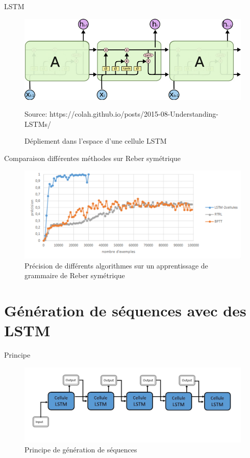 \documentclass{beamer}
\begin{document}
\begin{frame}{LSTM}
  \begin{figure}
  \begin{center}
  \includegraphics[scale=.40]{images/lstm_bptt.png}
  \caption{Dépliement dans l'espace d'une cellule LSTM}
  {\tiny Source: https://colah.github.io/posts/2015-08-Understanding-LSTMs/}
  \end{center}
  \end{figure}
\end{frame}

\begin{frame}{Comparaison différentes méthodes sur Reber symétrique}
  \begin{figure}
  \begin{center}
  \includegraphics[scale=.20]{images/comparaison.png}
  \caption{Précision de différents algorithmes sur un apprentissage de grammaire de Reber
  symétrique}
  \end{center}
  \end{figure}
\end{frame}

\section{Génération de séquences avec des LSTM}

\begin{frame}{Principe}
\begin{figure}
\begin{center}
\includegraphics[scale=0.5]{images/lstm_generation.png}
\caption{Principe de génération de séquences}
\end{center}
\end{figure}
\end{frame}
\end{document}
